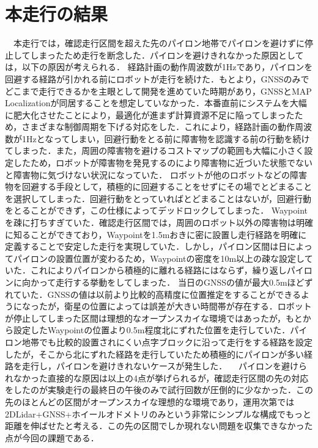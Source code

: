 \documentclass[platex,dvipdfmx]{rbproceedings}
\begin{document}
\section{本走行の結果}
　本走行では，確認走行区間を超えた先のパイロン地帯でパイロンを避けずに停止してしまったため走行を断念した．パイロンを避けきれなかった原因としては，以下の原因が考えられる．
経路計画の動作周波数が1Hzであり，パイロンを回避する経路が引かれる前にロボットが走行を続けた．もとより，GNSSのみでどこまで走行できるかを主眼として開発を進めていた時期があり，GNSSとMAP Localizationが同居することを想定していなかった．本番直前にシステムを大幅に肥大化させたことにより，最適化が進まず計算資源不足に陥ってしまったため，さまざまな制御周期を下げる対応をした．これにより，経路計画の動作周波数が1Hzとなってしまい，回避行動をとる前に障害物を認識する前の行動を続けてしまった．また，周囲の障害物を避けるコストマップの範囲も大幅に小さく設定したため，ロボットが障害物を発見するのにより障害物に近づいた状態でないと障害物に気づけない状況になっていた．
ロボットが他のロボットなどの障害物を回避する手段として，積極的に回避することをせずにその場でとどまることを選択してしまった．回避行動をとっていればとどまることはないが，回避行動をとることができず，この仕様によってデッドロックしてしまった．
Waypointを疎に打ちすぎていた．確認走行区間では，周囲のロボット以外の障害物は明確に知ることができており，Waypointを1.5mおきに密に設置し走行経路を明確に定義することで安定した走行を実現していた．しかし，パイロン区間は日によってパイロンの設置位置が変わるため，Waypointの密度を10m以上の疎な設定していた．これによりパイロンから積極的に離れる経路にはならず，繰り返しパイロンに向かって走行する挙動をしてしまった．
当日のGNSSの値が最大0.5mほどずれていた．GNSSの値は以前より比較的高精度に位置推定をすることができるようになったが，衛星の位置によっては誤差が大きい時間帯が存在する．ロボットが停止してしまった区間は理想的なオープンスカイな環境ではあったが，もとから設定したWaypointの位置より0.5m程度北にずれた位置を走行していた．パイロン地帯でも比較的設置されにくい点字ブロックに沿って走行をする経路を設定したが，そこから北にずれた経路を走行していたため積極的にパイロンが多い経路を走行し，パイロンを避けきれないケースが発生した．
　パイロンを避けられなかった直接的な原因は以上の4点が挙げられるが，確認走行区間の先の対応をしたのが実験走行の最終日の午後のみで試行回数が圧倒的に少なかった．この先のほとんどの区間がオープンスカイな理想的な環境であり，運用次第では2DLidar+GNSS+ホイールオドメトリのみという非常にシンプルな構成でもっと距離を伸ばせたと考える．この先の区間でしか現れない問題を収集できなかった点が今回の課題である．
\end{document}
